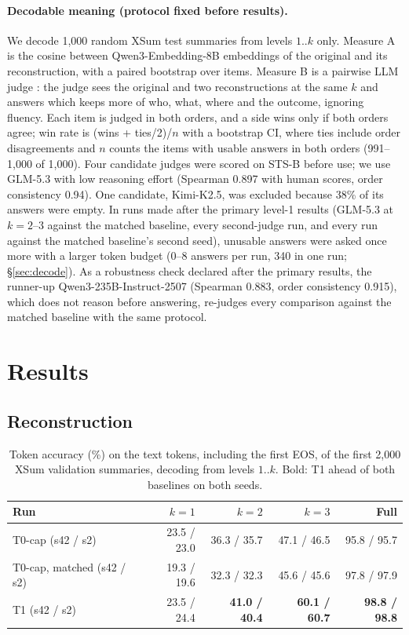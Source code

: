 \documentclass[11pt]{article}
\newcommand{\pos}[1]{\textbf{#1}}
\begin{document}
\paragraph{Decodable meaning (protocol fixed before results).}\label{sec:setup-meaning} We decode 1{,}000 random XSum test summaries from levels $1..k$ only. Measure A is the cosine between Qwen3-Embedding-8B embeddings of the original and its reconstruction, with a paired bootstrap over items. Measure B is a pairwise LLM judge \citep{zheng2023judge}: the judge sees the original and two reconstructions at the same $k$ and answers which keeps more of who, what, where and the outcome, ignoring fluency. Each item is judged in both orders, and a side wins only if both orders agree; win rate is (wins + ties/2)/$n$ with a bootstrap CI, where ties include order disagreements and $n$ counts the items with usable answers in both orders (991--1{,}000 of 1{,}000). Four candidate judges were scored on STS-B before use; we use GLM-5.3 with low reasoning effort (Spearman 0.897 with human scores, order consistency 0.94). One candidate, Kimi-K2.5, was excluded because 38\% of its answers were empty. In runs made after the primary level-1 results (GLM-5.3 at $k{=}2$--3 against the matched baseline, every second-judge run, and every run against the matched baseline's second seed), unusable answers were asked once more with a larger token budget (0--8 answers per run, 340 in one run; \S\ref{sec:decode}). As a robustness check declared after the primary results, the runner-up Qwen3-235B-Instruct-2507 (Spearman 0.883, order consistency 0.915), which does not reason before answering, re-judges every comparison against the matched baseline with the same protocol.

\section{Results}
\subsection{Reconstruction}
\begin{table}[t]
\centering
\small
\begin{tabular}{lrrrr}
\toprule
Run & $k{=}1$ & $k{=}2$ & $k{=}3$ & Full \\
\midrule
T0-cap (s42 / s2) & 23.5 / 23.0 & 36.3 / 35.7 & 47.1 / 46.5 & 95.8 / 95.7 \\
T0-cap, matched (s42 / s2) & 19.3 / 19.6 & 32.3 / 32.3 & 45.6 / 45.6 & 97.8 / 97.9 \\
T1 (s42 / s2) & 23.5 / 24.4 & \pos{41.0 / 40.4} & \pos{60.1 / 60.7} & \pos{98.8 / 98.8} \\
\bottomrule
\end{tabular}
\caption{Token accuracy (\%) on the text tokens, including the first EOS, of the first 2{,}000 XSum validation summaries, decoding from levels $1..k$. Bold: T1 ahead of both baselines on both seeds.}
\label{tab:recon}
\end{table}
\end{document}
